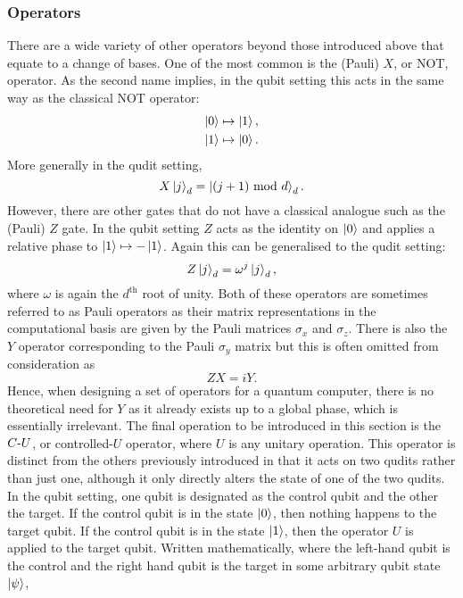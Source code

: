 \subsubsection{Operators}
\label{subsubsection:operators}
There are a wide variety of other operators beyond those introduced above that equate to a change of bases.
One of the most common is the (Pauli) $X$, or NOT, operator.
As the second name implies, in the qubit setting this acts in the same way as the classical NOT operator:
\begin{align}
    \ket{0} &\mapsto \ket{1},\\
    \ket{1} &\mapsto \ket{0}.
\end{align}
More generally in the qudit setting,
\begin{equation}
    X\ket{j}_d = \ket{(j + 1) \text{ mod } d}_d.
\end{equation}
However, there are other gates that do not have a classical analogue such as the (Pauli) $Z$ gate.
In the qubit setting $Z$ acts as the identity on $\ket{0}$ and applies a relative phase to $\ket{1} \mapsto -\ket{1}$.
Again this can be generalised to the qudit setting:
\begin{equation}
    Z\ket{j}_d = \omega^j\ket{j}_d,
\end{equation}
where $\omega$ is again the $d^{\text{th}}$ root of unity.
Both of these operators are sometimes referred to as Pauli operators as their matrix representations in the computational basis are given by the Pauli matrices $\sigma_x$ and $\sigma_z$.
There is also the $Y$ operator corresponding to the Pauli $\sigma_y$ matrix but this is often omitted from consideration as
\begin{equation}
    ZX = iY.
\end{equation}
Hence, when designing a set of operators for a quantum computer, there is no theoretical need for $Y$ as it already exists up to a global phase, which is essentially irrelevant.
The final operation to be introduced in this section is the $C\text{-}U$, or controlled-$U$ operator, where $U$ is any unitary operation.
This operator is distinct from the others previously introduced in that it acts on two qudits rather than just one, although it only directly alters the state of one of the two qudits.
In the qubit setting, one qubit is designated as the control qubit and the other the target.
If the control qubit is in the state $\ket{0}$, then nothing happens to the target qubit.
If the control qubit is in the state $\ket{1}$, then the operator $U$ is applied to the target qubit.
Written mathematically, where the left-hand qubit is the control and the right hand qubit is the target in some arbitrary qubit state $\ket{\psi}$,
